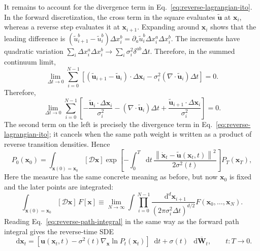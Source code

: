 \documentclass[11pt]{article}
\newcommand{\vct}[1]{\bm{#1}}
\newcommand{\dd}{\mathop{}\!\mathrm{d}}
\begin{document}
It remains to account for the divergence term in
Eq.~\eqref{eq:reverse-lagrangian-ito}. In the forward discretization, the cross
term in the square evaluates \(\widetilde{\vct{u}}\) at \(\vct{x}_i\), whereas a
reverse step evaluates it at \(\vct{x}_{i+1}\). Expanding around \(\vct{x}_i\)
shows that the leading difference is
\((\widetilde{u}_{i+1}^b-\widetilde{u}_i^b)\Delta x_i^b
=\partial_a\widetilde{u}_i^b\Delta x_i^a\Delta x_i^b\). The increments have
quadratic variation
\(\sum_i\Delta x_i^a\Delta x_i^b\to
\sum_i\sigma_i^2\delta^{ab}\Delta t\). Therefore, in the summed continuum limit,
\begin{equation}
    \lim_{\Delta t\to0}\sum_{i=0}^{N-1}
    \left[(\widetilde{\vct{u}}_{i+1}-\widetilde{\vct{u}}_i)
    \cdot\Delta\vct{x}_i
    -\sigma_i^2(\nabla\cdot\widetilde{\vct{u}}_i)\Delta t\right]=0.
    \label{eq:forward-reverse-discretization}
\end{equation}
Therefore,
\begin{equation}
    \lim_{\Delta t\to0}\sum_{i=0}^{N-1}
    \left[-\frac{\widetilde{\vct{u}}_i\cdot\Delta\vct{x}_i}{\sigma_i^2}
    -(\nabla\cdot\widetilde{\vct{u}}_i)\Delta t
    +\frac{\widetilde{\vct{u}}_{i+1}\cdot\Delta\vct{x}_i}{\sigma_i^2}\right]=0.
    \label{eq:jacobian-cancellation}
\end{equation}
The second term on the left is precisely the divergence term in
Eq.~\eqref{eq:reverse-lagrangian-ito}; it cancels when the same path weight is
written as a product of reverse transition densities. Hence
\begin{equation}
    P_0(\vct{x}_0)
    =\int_{\vct{x}(0)=\vct{x}_0}[\mathcal{D}\vct{x}]
    \exp\!\left[-\int_0^T\dd t\,
    \frac{\left\lVert\dot{\vct{x}}_t-\widetilde{\vct{u}}(\vct{x}_t,t)
    \right\rVert^2}{2\sigma^2(t)}\right]P_T(\vct{x}_T),
    \label{eq:reverse-path-integral}
\end{equation}
Here the measure has the same concrete meaning as before, but now
\(\vct{x}_0\) is fixed and the later points are integrated:
\begin{equation}
    \int_{\vct{x}(0)=\vct{x}_0}[\mathcal{D}\vct{x}]\,F[\vct{x}]
    \equiv\lim_{N\to\infty}
    \int\prod_{i=0}^{N-1}
    \frac{\dd^d\vct{x}_{i+1}}{(2\pi\sigma_i^2\Delta t)^{d/2}}
    F(\vct{x}_0,\ldots,\vct{x}_N).
    \label{eq:reverse-measure-definition}
\end{equation}
Reading Eq.~\eqref{eq:reverse-path-integral} in the same way as the forward path
integral gives the reverse-time SDE
\begin{equation}
    \dd\vct{x}_t
    =\left[\vct{u}(\vct{x}_t,t)
    -\sigma^2(t)\nabla_{\vct{x}}\ln P_t(\vct{x}_t)\right]\dd t
    +\sigma(t)\,\dd\overline{\vct{W}}_t,
    \qquad t:T\longrightarrow0.
    \label{eq:reverse-sde}
\end{equation}
\end{document}
